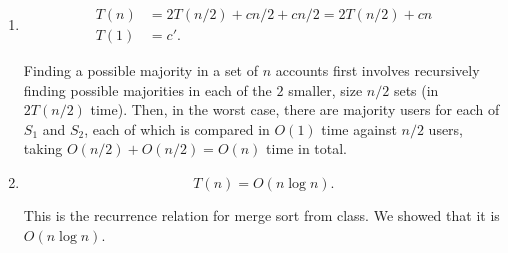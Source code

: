 \documentclass[12 pt, letterpaper]{hmcpset}
\begin{document}
\begin{solution}
\begin{enumerate}
			If neither of the majority users of $S_{1}$ and $S_{2}$ are majority users of $S$, then there are no majority users of $S$ (by our earlier argument). The desired output is $\mathtt{null}$ and this is the output of $\mathtt{BotAlike}$.
		\item 
			\[
				\boxed{
					\begin{aligned}
						T(n) & = 2 T(n / 2) + cn/2 + cn/2 = 2 T(n / 2) + c n \\
						T(1) & = c'.
					\end{aligned}
				}
			\]

			Finding a possible majority in a set of $n$ accounts first involves recursively finding possible majorities in each of the $2$ smaller, size $n / 2$ sets (in $2 T(n / 2)$ time). Then, in the worst case, there are majority users for each of $S_{1}$ and $S_{2}$, each of which is compared in $O(1)$ time against $n / 2$ users, taking $O(n / 2) + O(n / 2) = O(n)$ time in total.

		\item
			\[
				\boxed{
					T(n) = O(n \log n).
				}
			\]

			This is the recurrence relation for merge sort from class. We showed that it is $O(n \log n)$.

	\end{enumerate}
\end{solution}

\pagebreak
\end{document}
